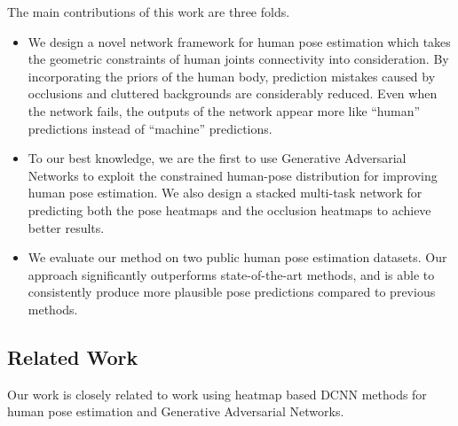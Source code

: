 \documentclass[10pt,letterpaper,twocolumn]{article}
\begin{document}
The main contributions of this work are three folds.
\begin{itemize}
  \itemsep -0.125cm
\item We design a novel network framework for human pose estimation which takes the geometric constraints of human joints connectivity into consideration. By incorporating the priors of the human body, prediction mistakes caused by occlusions and cluttered backgrounds are considerably reduced. Even when the network fails, the outputs of the network appear more like ``human'' predictions instead of ``machine'' predictions.

\item To our best knowledge, we are the first to use Generative Adversarial Networks to exploit  the constrained human-pose distribution for improving  human pose estimation. We also design a stacked multi-task network for predicting both the pose heatmaps and the occlusion heatmaps to achieve better results.

\item We evaluate our method on two public human pose estimation datasets. Our approach significantly outperforms state-of-the-art methods, and is able to consistently produce more plausible pose predictions compared to previous methods.
\end{itemize}

\subsection{Related Work} \label{sec:Related-Work}

Our work is closely related to work using heatmap based DCNN methods for human pose estimation and Generative Adversarial Networks.
\end{document}
